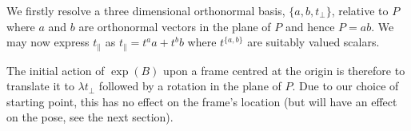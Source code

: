 We firstly resolve a three dimensional orthonormal basis, $\{a,b,t_\perp\}$,
relative to $P$
where $a$ and $b$ are orthonormal vectors in the plane of $P$ and hence
$P = ab$. We may now express $t_\parallel$ as $t_\parallel = t^a a + t^b b$ where $t^{\{a,b\}}$ are suitably
valued scalars.

The initial action of $\exp(B)$ upon a frame centred at the origin is therefore to 
translate it to $\lambda t_\perp$ followed by a rotation in the plane of $P$. Due to our choice of starting
point, this has no effect on the frame's location (but will have an effect on the pose, 
see the next section).



